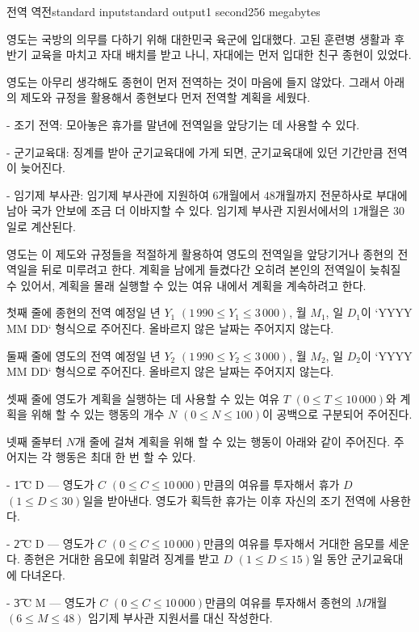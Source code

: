 \begin{problem}{전역 역전}{standard input}{standard output}{1 second}{256 megabytes}

영도는 국방의 의무를 다하기 위해 대한민국 육군에 입대했다. 고된 훈련병 생활과 후반기 교육을 마치고 자대 배치를 받고 나니, 자대에는 먼저 입대한 친구 종현이 있었다.

영도는 아무리 생각해도 종현이 먼저 전역하는 것이 마음에 들지 않았다. 그래서 아래의 제도와 규정을 활용해서 종현보다 먼저 전역할 계획을 세웠다.

- 조기 전역: 모아놓은 휴가를 말년에 전역일을 앞당기는 데 사용할 수 있다.

- 군기교육대: 징계를 받아 군기교육대에 가게 되면, 군기교육대에 있던 기간만큼 전역이 늦어진다.

- 임기제 부사관: 임기제 부사관에 지원하여 $6$개월에서 $48$개월까지 전문하사로 부대에 남아 국가 안보에 조금 더 이바지할 수 있다. 임기제 부사관 지원서에서의 $1$개월은 $30$일로 계산된다.

영도는 이 제도와 규정들을 적절하게 활용하여 영도의 전역일을 앞당기거나 종현의 전역일을 뒤로 미루려고 한다. 계획을 남에게 들켰다간 오히려 본인의 전역일이 늦춰질 수 있어서, 계획을 몰래 실행할 수 있는 여유 내에서 계획을 계속하려고 한다.


\InputFile
첫째 줄에 종현의 전역 예정일 년 $Y_1$ $(1\,990 ≤ Y_1 ≤ 3\,000)$, 월 $M_1$, 일 $D_1$이 `YYYY MM DD` 형식으로 주어진다. 올바르지 않은 날짜는 주어지지 않는다.  

둘째 줄에 영도의 전역 예정일 년 $Y_2$ $(1\,990 ≤ Y_2 ≤ 3\,000)$, 월 $M_2$, 일 $D_2$이 `YYYY MM DD` 형식으로 주어진다. 올바르지 않은 날짜는 주어지지 않는다.

셋째 줄에 영도가 계획을 실행하는 데 사용할 수 있는 여유 $T$ $(0 \le T \le 10\,000)$와 계획을 위해 할 수 있는 행동의 개수 $N$ $(0 \le N \le 100)$이 공백으로 구분되어 주어진다.

넷째 줄부터 $N$개 줄에 걸쳐 계획을 위해 할 수 있는 행동이 아래와 같이 주어진다. 주어지는 각 행동은 최대 한 번 할 수 있다.

 - \t{1 C D} --- 영도가 $C$ $(0 \le C \le 10\,000)$만큼의 여유를 투자해서 휴가 $D$ $(1 \le D \le 30)$일을 받아낸다. 영도가 획득한 휴가는 이후 자신의 조기 전역에 사용한다.

 - \t{2 C D} --- 영도가 $C$ $(0 \le C \le 10\,000)$만큼의 여유를 투자해서 거대한 음모를 세운다. 종현은 거대한 음모에 휘말려 징계를 받고 $D$ $(1 \le D \le 15)$일 동안 군기교육대에 다녀온다.

 - \t{3 C M} --- 영도가 $C$ $(0 \le C \le 10\,000)$만큼의 여유를 투자해서 종현의 $M$개월$(6 \le M \le 48)$ 임기제 부사관 지원서를 대신 작성한다.


\end{problem}

